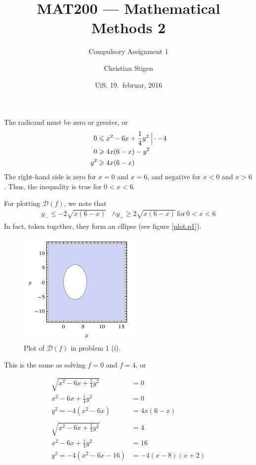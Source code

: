 \documentclass[a4paper,norsk,12pt]{article}
\title{MAT200 --- Mathematical Methods 2}
\subtitle{Compulsory Assignment 1}
\author{Christian Stigen}
\date{UiS, 19.~februar, 2016}
\begin{document}
\maketitle

\label{problem.1}

The radicand must be zero or greater, or
\begin{align*}
  0 & \leqslant x^2-6x+\frac{1}{4}y^2 \> \Big{|} \cdot-4 \\
  0 & \geqslant 4x(6-x)-y^2 \\
  y^2 & \geqslant 4x(6-x)
\end{align*}
The right-hand side is zero for $x=0$ and $x=6$, and negative for $x<0$
and $x>6$. Thus, the inequality is true for $0 < x < 6$.

For plotting $\mathcal{D}(f)$, we note that
\begin{align*}
  y_{-} \leqslant -2\sqrt{x(6-x)} & \wedge y_{+} \geqslant 2\sqrt{x(6-x)}
  \,\text{for}\, 0<x<6
\end{align*}
In fact, taken together, they form an ellipse (see figure \vref{plot.p1}).

\begin{figure}[htp]
  \centering
  \includegraphics{ob1plot.png}
  \caption{Plot of $\mathcal{D}(f)$ in problem 1 (i).}
  \label{plot.p1}
\end{figure}


This is the same as solving $f=0$ and $f=4$, or

\begin{align*}
  \sqrt{x^2 - 6x + \frac{1}{4}y^2} &= 0\\
  x^2 - 6x + \frac{1}{4}y^2 &= 0\\
  y^2 = -4(x^2 - 6x) &= 4x(6-x) \\
  \\
  \sqrt{x^2 - 6x + \frac{1}{4}y^2} &= 4\\
  x^2 - 6x + \frac{1}{4}y^2 &= 16 \\
  y^2 = -4\left(x^2 - 6x - 16\right) &= -4(x-8)(x+2) \\
\end{align*}
\end{document}
